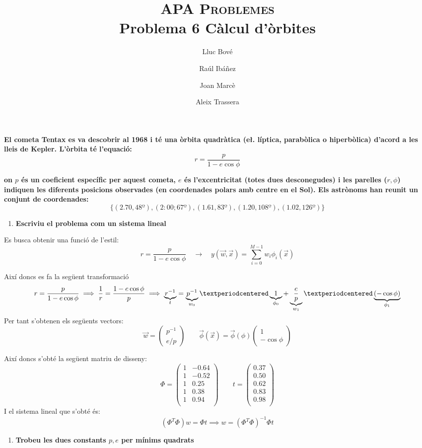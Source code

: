 \documentclass[a4paper]{article}
\title{\textsc{APA Problemes} \\ Problema 6 Càlcul d'òrbites}
\author{Lluc Bové \and Raúl Ibáñez \and Joan Marcè \and Aleix Trassera}
\date{}
\begin{document}
\maketitle

\textbf{El cometa Tentax es va descobrir al 1968 i té una òrbita quadràtica (e\l. líptica, parabòlica o hiperbòlica) d'acord a les lleis de Kepler. L'òrbita té l'equació:}
$$
r = \frac{p}{1 - e \cos \phi}
$$

\textbf{on $p$ és un coeficient específic per aquest cometa, $e$ és l'excentricitat (totes dues desconegudes) i les parelles ($r,\phi$) indiquen les diferents posicions observades (en coordenades polars amb centre en el Sol). Els astrònoms han reunit un conjunt de coordenades:}
$$
\{(2.70, 48º), (2:00; 67º), (1.61, 83º), (1.20, 108º), (1.02, 126º)\}
$$

\begin{enumerate}
	\item \textbf{Escriviu el problema com un sistema lineal}
\end{enumerate}

Es busca obtenir una funció de l'estil:
$$
r = \frac{p}{1 - e \cos\phi} \quad \longrightarrow \quad y(\vec{w}, \vec{x}) = \sum_{i=0}^{M - 1} w_i \phi_i(\vec{x})
$$

Així doncs es fa la següent transformació
$$
r = \frac{p}{1 - e \cos \phi} \implies \frac{1}{r} = \frac{1 - e \cos \phi}{p} 
\implies \underbrace{r^{-1}}_{t} = 
\underbrace{p^{-1}}_{w_0}·
\underbrace{1}_{\mathclap{\phi_0}} +
\underbrace{\frac{e}{p}}_{w_1}·\underbrace{(-\cos\phi)}_{\phi_1}
$$
Per tant s'obtenen els següents vectors:
$$
\vec{w} = 
\begin{pmatrix}
p^{-1}\\
e/p
\end{pmatrix}
\qquad
\vec{\phi}(\vec{x}) = \vec{\phi}(\phi)
\begin{pmatrix}
1\\
- \cos \phi 
\end{pmatrix}
$$

Així doncs s'obté la següent matriu de disseny:
$$
\Phi = 
\begin{pmatrix}
1 & -0.64 \\
1 & -0.52 \\
1 & 0.25 \\
1 & 0.38 \\
1 & 0.94 \\
\end{pmatrix}
\qquad
t =
\begin{pmatrix}
0.37 \\
0.50 \\
0.62 \\
0.83 \\
0.98 \\
\end{pmatrix}
$$
I el sistema lineal que s'obté és:
$$
(\Phi^T\Phi)w = \Phi t \implies w = (\Phi^T\Phi)^{-1} \Phi t 
$$
\begin{enumerate}[resume]
	\item \textbf{Trobeu les dues constants $p,e$ per mínims quadrats}
\end{enumerate}
\end{document}
